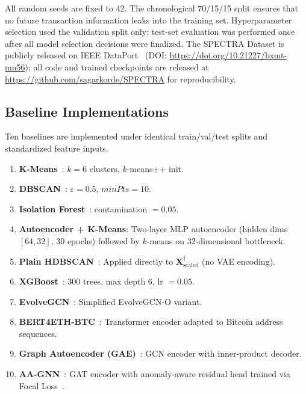 \documentclass[journal]{IEEEtran}
\begin{document}
All random seeds are fixed to 42.  The chronological 70/15/15 split
ensures that no future transaction information leaks into the training set.
Hyperparameter selection used the validation split only; test-set evaluation
was performed once after all model selection decisions were finalized.
The SPECTRA Dataset is publicly released on IEEE DataPort~\cite{Korde2026Dataset}
(DOI: \url{https://doi.org/10.21227/bxmt-mn56}); all code and trained
checkpoints are released at \url{https://github.com/sagarkorde/SPECTRA}
for reproducibility.

\subsection{Baseline Implementations}
\label{subsec:baselines}

Ten baselines are implemented under identical train/val/test splits and
standardized feature inputs.

\begin{enumerate}[leftmargin=*, label=\textbf{B\arabic*}]
  \item \textbf{K-Means}~\cite{Lloyd1982}: $k = 6$ clusters, $k$-means++ init.
  \item \textbf{DBSCAN}~\cite{Ester1996}: $\varepsilon = 0.5$, $\textit{minPts} = 10$.
  \item \textbf{Isolation Forest}~\cite{Liu2008}: contamination $= 0.05$.
  \item \textbf{Autoencoder + K-Means}: Two-layer MLP autoencoder (hidden
    dims $[64, 32]$, 30 epochs) followed by $k$-means on 32-dimensional bottleneck.
  \item \textbf{Plain HDBSCAN}~\cite{McInnes2017}: Applied directly to
    $\mathbf{X}^{\dagger}_{\text{scaled}}$ (no VAE encoding).
  \item \textbf{XGBoost}~\cite{Chen2016}: 300 trees, max depth 6, lr $= 0.05$.
  \item \textbf{EvolveGCN}~\cite{Pareja2020}: Simplified EvolveGCN-O variant.
  \item \textbf{BERT4ETH-BTC}~\cite{He2023}: Transformer encoder adapted to
    Bitcoin address sequences.
  \item \textbf{Graph Autoencoder (GAE)}~\cite{Kipf2016b}: GCN encoder with
    inner-product decoder.
  \item \textbf{AA-GNN}~\cite{ZhaoW2026}: GAT encoder with anomaly-aware residual
    head trained via Focal Loss~\cite{Lin2017}.
\end{enumerate}
\end{document}
